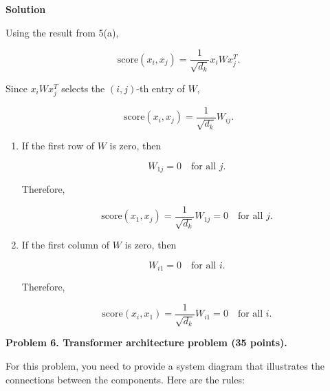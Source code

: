 \documentclass[12pt]{article}
\begin{document}
	\noindent\textbf{Solution}
	
	Using the result from 5(a),
	
	\[
	\mathrm{score}(x_i,x_j)
	=
	\frac{1}{\sqrt{d_k}}x_iWx_j^T.
	\]
	
	Since \(x_iWx_j^T\) selects the \((i,j)\)-th entry of \(W\),
	
	\[
	\mathrm{score}(x_i,x_j)
	=
	\frac{1}{\sqrt{d_k}}W_{ij}.
	\]
	
	\begin{enumerate}[itemsep=4pt]
		
		\item[(i)] If the first row of \(W\) is zero, then
		
		\[
		W_{1j}=0
		\quad \text{for all } j.
		\]
		
		Therefore,
		
		\[
		\mathrm{score}(x_1,x_j)
		=
		\frac{1}{\sqrt{d_k}}W_{1j}
		=
		0
		\quad \text{for all } j.
		\]
		
		\item[(ii)] If the first column of \(W\) is zero, then
		
		\[
		W_{i1}=0
		\quad \text{for all } i.
		\]
		
		Therefore,
		
		\[
		\mathrm{score}(x_i,x_1)
		=
		\frac{1}{\sqrt{d_k}}W_{i1}
		=
		0
		\quad \text{for all } i.
		\]
		
	\end{enumerate}
	
	\newpage
	
	\noindent\textbf{Problem 6. Transformer architecture problem (35 points).}
	
	For this problem, you need to provide a system diagram that illustrates the connections between the components. Here are the rules:
	
\end{document}
